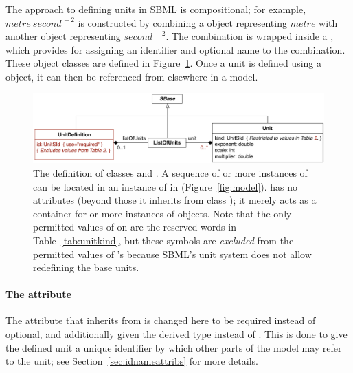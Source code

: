 \subsubsection{}
\label{sec:unitdefinition-structure}

The approach to defining units in SBML is compositional; for
example, $metre\ second^{\,-2}$ is constructed by combining a
\Unit object representing $metre$ with another \Unit object
representing $second^{\,-2}$.  The combination is wrapped inside a
\UnitDefinition, which provides for assigning an identifier and
optional name to the combination.  These object classes are
defined in Figure~\ref{fig:unitdefinition}.  Once a unit is
defined using a \UnitDefinition object, it can then be referenced
from elsewhere in a model.

\begin{figure}[htb]
  \centering
  \vspace*{1ex}
  \includegraphics[scale=0.78]{figs/unitdefinition-uml}
  \caption{The definition of classes \UnitDefinition and
      \Unit.  A sequence of  or more instances of
      \UnitDefinition can be located in an instance of
      \ListOfUnitDefinitions in \Model
      (Figure~\protect\ref{fig:model}).  \ListOfUnits has
      no attributes (beyond those it inherits from class \SBaseUpright);
      it merely acts as a container for  or more instances of
      \Unit objects.  Note that the only permitted values of
       on \Unit are the reserved words in
      Table~\vref{tab:unitkind}, but these symbols are
      \emph{excluded} from the permitted values of
      \UnitDefinition's  because SBML's unit system does
      not allow redefining the base units.}
  \label{fig:unitdefinition}
\end{figure}

\begin{blockChanged}
{\paragraph{The  attribute}}

The  attribute that \UnitDefinition inherits from \SBase is changed here to be required instead of optional, and additionally given the derived type  instead of .  This is done to give the defined unit a unique identifier by which other parts of the model may refer to the unit; see Section~\ref{sec:idnameattribs} for more details.
\end{blockChanged}

